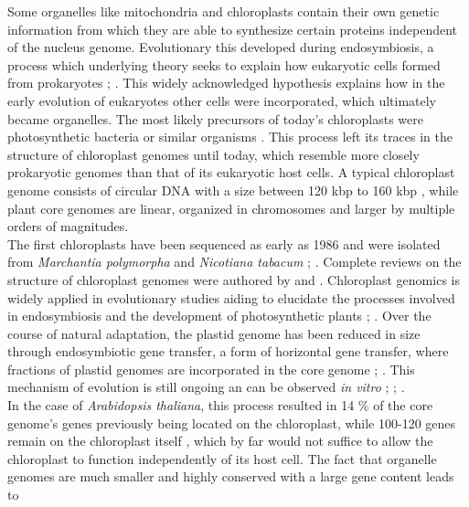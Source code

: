 Some organelles like mitochondria and chloroplasts contain their own genetic information
from which they are able to synthesize certain proteins independent of the nucleus
genome. Evolutionary this developed during endosymbiosis, a process which underlying
theory seeks to explain how eukaryotic cells formed from prokaryotes
\cite{mereschkowsky1905uber}; \cite{kutschera2005endosymbiosis}. This widely acknowledged
hypothesis explains how in the early evolution of eukaryotes other cells were
incorporated, which ultimately became organelles. The most likely precursors of today's
chloroplasts were photosynthetic bacteria or similar organisms
\cite{archibald2015endosymbiosis}. This process left its traces in the structure of
chloroplast genomes until today, which resemble more closely prokaryotic genomes than that
of its eukaryotic host cells. A typical chloroplast genome consists of circular DNA with a
size between 120 kbp to 160 kbp \cite{palmer_1985}, while plant core genomes are linear,
organized in chromosomes and larger by multiple orders of magnitudes. \\
The first chloroplasts have been sequenced as early as 1986 and were isolated from
\textit{Marchantia polymorpha} and \textit{Nicotiana tabacum}
\cite{ohyama_chloroplast_1986}; \cite{shinozaki_complete_1986}. Complete reviews on the
structure of chloroplast genomes were authored by \cite{green_chloroplast_2011} and
\cite{wicke_evolution_2011}. Chloroplast genomics is widely applied in evolutionary
studies aiding to elucidate the processes involved in endosymbiosis and the development of
photosynthetic plants \cite{martin_evolutionary_2002};
\cite{xiao-ming_inferring_2017}. Over the course of natural adaptation, the plastid genome has
been reduced in size through endosymbiotic gene transfer, a form of horizontal gene
transfer, where fractions of plastid genomes are incorporated in the core genome
\cite{martin_evolutionary_2002}; \cite{deiner_environmental_2017}. This mechanism of
evolution is still ongoing an can be observed \textit{in vitro} \cite{bock2017witnessing};
\cite{fuentes2014horizontal}; \cite{stegemann2009exchange}. \\
In the case of \textit{Arabidopsis thaliana}, this process resulted in 14 \% of the core
genome's genes previously being located on the chloroplast, while 100-120 genes remain on
the chloroplast itself \cite{wicke_evolution_2011}, which by far would not suffice to
allow the chloroplast to function independently of its host cell. The fact that organelle
genomes are much smaller and highly conserved with a large gene content leads to

